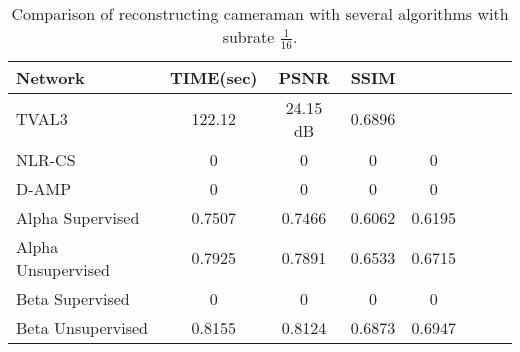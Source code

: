 \begin{table}[tb]
\caption[Timing and qualitz metrics cameranman]{Comparison of reconstructing cameraman with several algorithms with subrate $\frac{1}{16}$.}
\label{tab:summaryComp}
\centering
\begin{tabular}{l*{6}{c}r}
Network              & TIME(sec) & PSNR & SSIM \\
\hline
TVAL3 & 122.12 & 24.15 dB & 0.6896\\
NLR-CS & 0 & 0 & 0 & 0 \\
D-AMP & 0 & 0 & 0 & 0 \\
Alpha Supervised   & 0.7507 & 0.7466 & 0.6062 & 0.6195\\
Alpha Unsupervised     & 0.7925 & 0.7891 & 0.6533 & 0.6715\\
Beta Supervised & 0 & 0 & 0 & 0 \\
Beta Unsupervised & 0.8155 & 0.8124 & 0.6873 & 0.6947\\
\bottomrule 
\end{tabular}  
\end{table}

\FloatBarrier

